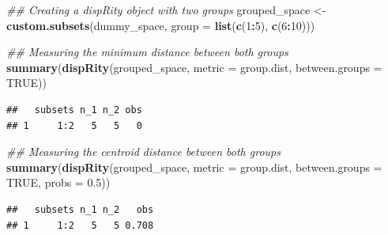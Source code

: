 \documentclass[]{book}
\newenvironment{Shaded}{\begin{snugshade}}{\end{snugshade}}
\newcommand{\CommentTok}[1]{\textcolor[rgb]{0.56,0.35,0.01}{\textit{#1}}}
\newcommand{\DataTypeTok}[1]{\textcolor[rgb]{0.13,0.29,0.53}{#1}}
\newcommand{\DecValTok}[1]{\textcolor[rgb]{0.00,0.00,0.81}{#1}}
\newcommand{\FloatTok}[1]{\textcolor[rgb]{0.00,0.00,0.81}{#1}}
\newcommand{\KeywordTok}[1]{\textcolor[rgb]{0.13,0.29,0.53}{\textbf{#1}}}
\newcommand{\NormalTok}[1]{#1}
\newcommand{\OperatorTok}[1]{\textcolor[rgb]{0.81,0.36,0.00}{\textbf{#1}}}
\newcommand{\OtherTok}[1]{\textcolor[rgb]{0.56,0.35,0.01}{#1}}
\newcommand{\StringTok}[1]{\textcolor[rgb]{0.31,0.60,0.02}{#1}}
\begin{document}
\begin{Shaded}
\begin{Highlighting}[]
\CommentTok{## Creating a dispRity object with two groups}
\NormalTok{grouped_space <-}\StringTok{ }\KeywordTok{custom.subsets}\NormalTok{(dummy_space,}
                      \DataTypeTok{group =} \KeywordTok{list}\NormalTok{(}\KeywordTok{c}\NormalTok{(}\DecValTok{1}\OperatorTok{:}\DecValTok{5}\NormalTok{), }\KeywordTok{c}\NormalTok{(}\DecValTok{6}\OperatorTok{:}\DecValTok{10}\NormalTok{)))}

\CommentTok{## Measuring the minimum distance between both groups}
\KeywordTok{summary}\NormalTok{(}\KeywordTok{dispRity}\NormalTok{(grouped_space, }\DataTypeTok{metric =}\NormalTok{ group.dist,}
                 \DataTypeTok{between.groups =} \OtherTok{TRUE}\NormalTok{))}
\end{Highlighting}
\end{Shaded}

\begin{verbatim}
##   subsets n_1 n_2 obs
## 1     1:2   5   5   0
\end{verbatim}

\begin{Shaded}
\begin{Highlighting}[]
\CommentTok{## Measuring the centroid distance between both groups}
\KeywordTok{summary}\NormalTok{(}\KeywordTok{dispRity}\NormalTok{(grouped_space, }\DataTypeTok{metric =}\NormalTok{ group.dist,}
                 \DataTypeTok{between.groups =} \OtherTok{TRUE}\NormalTok{, }\DataTypeTok{probs =} \FloatTok{0.5}\NormalTok{))}
\end{Highlighting}
\end{Shaded}

\begin{verbatim}
##   subsets n_1 n_2   obs
## 1     1:2   5   5 0.708
\end{verbatim}

\begin{Shaded}
\end{Shaded}
\end{document}
